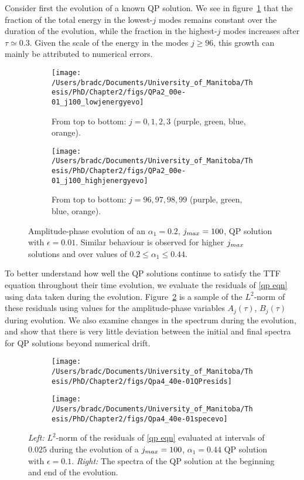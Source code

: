 \documentclass[../PhD.tex]{subfiles}
\begin{document}
Consider first the evolution of a known QP solution. We see in figure~\ref{fig:qpevo} that the fraction of the total energy in the lowest-$j$ modes remains constant over the duration of the evolution, while the fraction in the highest-$j$ modes increases after $\tau \simeq 0.3$. Given the scale of the energy in the modes $j \geq 96$, this growth can mainly be attributed to numerical errors.

\begin{figure}[h]
	\centering
	\begin{subfigure}[t]{0.45\textwidth}
		\texttt{[image: /Users/bradc/Documents/University\_of\_Manitoba/Thesis/PhD/Chapter2/figs/QPa2\_00e-01\_j100\_lowjenergyevo]}
		\caption{From top to bottom: $j=0, 1, 2, 3$ (purple, green, blue, orange).}
	\end{subfigure}
	\;
	\begin{subfigure}[t]{0.45\textwidth}
		\texttt{[image: /Users/bradc/Documents/University\_of\_Manitoba/Thesis/PhD/Chapter2/figs/QPa2\_00e-01\_j100\_highjenergyevo]}
		\caption{From top to bottom: $j=96, 97, 98, 99$ (purple, green, blue, orange).}
	\end{subfigure}
	\caption{Amplitude-phase evolution of an $\alpha_1 = 0.2$, $j_{max} = 100$, QP solution with $\epsilon=0.01$. Similar behaviour is observed for higher $j_{max}$ solutions and over values of $0.2 \leq \alpha_1 \leq 0.44$.}
	\label{fig:qpevo}
\end{figure}

To better understand how well the QP solutions continue to satisfy the TTF equation throughout their time evolution, we evaluate the residuals of \eqref{qp eqn} using data taken during the evolution. Figure~\ref{fig: Qpa4_40e-01QPresids} is a sample of the $L^2$-norm of these residuals using values for the amplitude-phase variables $A_j(\tau)$, $B_j(\tau)$ during evolution. We also examine changes in the spectrum during the evolution, and show that there is very little deviation between the initial and final spectra for QP solutions beyond numerical drift.

\begin{figure}[h]
	\centering
	\begin{subfigure}[t]{0.45\textwidth}
		\texttt{[image: /Users/bradc/Documents/University\_of\_Manitoba/Thesis/PhD/Chapter2/figs/Qpa4\_40e-01QPresids]}
	\end{subfigure}
	\;
	\begin{subfigure}[t]{0.45\textwidth}
		\texttt{[image: /Users/bradc/Documents/University\_of\_Manitoba/Thesis/PhD/Chapter2/figs/Qpa4\_40e-01specevo]}
	\end{subfigure}
	\caption{{\it Left:} $L^2$-norm of the residuals of \eqref{qp eqn} evaluated at intervals of $0.025$ during the evolution of a $j_{max} = 100$, $\alpha_1 = 0.44$ QP solution with $\epsilon = 0.1$. {\it Right:} The spectra of the QP solution at the beginning and end of the evolution.}
	\label{fig: Qpa4_40e-01QPresids}
\end{figure}
\end{document}
